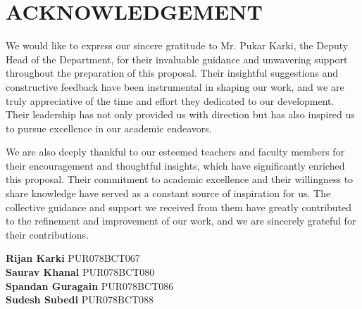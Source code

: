 \chapter*{ACKNOWLEDGEMENT}

We would like to express our sincere gratitude to Mr. Pukar Karki, the Deputy Head of the Department, for their invaluable guidance and unwavering support throughout the preparation of this proposal. Their insightful suggestions and constructive feedback have been instrumental in shaping our work, and we are truly appreciative of the time and effort they dedicated to our development. Their leadership has not only provided us with direction but has also inspired us to pursue excellence in our academic endeavors.

We are also deeply thankful to our esteemed teachers and faculty members for their encouragement and thoughtful insights, which have significantly enriched this proposal. Their commitment to academic excellence and their willingness to share knowledge have served as a constant source of inspiration for us. The collective guidance and support we received from them have greatly contributed to the refinement and improvement of our work, and we are sincerely grateful for their contributions.

\vspace{1cm}
\textbf{Rijan Karki} 
PUR078BCT067\\
\textbf{Saurav Khanal} 
PUR078BCT080\\
\textbf{Spandan Guragain} 
PUR078BCT086\\
\textbf{Sudesh Subedi} 
PUR078BCT088\\
